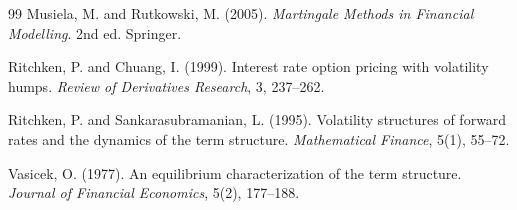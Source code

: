\documentclass[11pt,oneside]{book}
\begin{document}
\begin{thebibliography}{99}
Musiela, M. and Rutkowski, M. (2005).
\emph{Martingale Methods in Financial Modelling}.
2nd ed. Springer.

Ritchken, P. and Chuang, I. (1999).
Interest rate option pricing with volatility humps.
\emph{Review of Derivatives Research}, 3, 237--262.

Ritchken, P. and Sankarasubramanian, L. (1995).
Volatility structures of forward rates and the dynamics of the term structure.
\emph{Mathematical Finance}, 5(1), 55--72.

Vasicek, O. (1977).
An equilibrium characterization of the term structure.
\emph{Journal of Financial Economics}, 5(2), 177--188.

\end{thebibliography}
\end{document}
